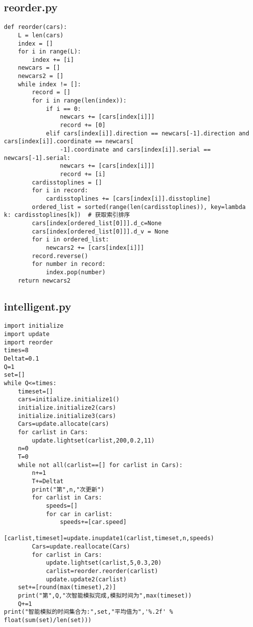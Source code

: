 \documentclass[a4paper,12pt]{article}
\numberwithin{equation}{section}
\begin{document}
\begin{appendix}
	\subsection{reorder.py}
	\begin{lstlisting}
def reorder(cars):    
    L = len(cars)
    index = []
    for i in range(L):
        index += [i]
    newcars = []
    newcars2 = []
    while index != []:
        record = []
        for i in range(len(index)):
            if i == 0:
                newcars += [cars[index[i]]]
                record += [0]
            elif cars[index[i]].direction == newcars[-1].direction and cars[index[i]].coordinate == newcars[
                -1].coordinate and cars[index[i]].serial == newcars[-1].serial:
                newcars += [cars[index[i]]]
                record += [i]
        cardisstoplines = []
        for i in record:
            cardisstoplines += [cars[index[i]].disstopline]
        ordered_list = sorted(range(len(cardisstoplines)), key=lambda k: cardisstoplines[k])  # 获取索引排序
        cars[index[ordered_list[0]]].d_c=None
        cars[index[ordered_list[0]]].d_v = None
        for i in ordered_list:
            newcars2 += [cars[index[i]]]
        record.reverse()
        for number in record:
            index.pop(number)
    return newcars2
	\end{lstlisting}
	\subsection{intelligent.py}
	\begin{lstlisting}
import initialize
import update
import reorder
times=8
Deltat=0.1
Q=1
set=[]
while Q<=times:
    timeset=[]
    cars=initialize.initialize1()
    initialize.initialize2(cars)
    initialize.initialize3(cars)
    Cars=update.allocate(cars)
    for carlist in Cars:
        update.lightset(carlist,200,0.2,11)
    n=0
    T=0
    while not all(carlist==[] for carlist in Cars):
        n+=1
        T+=Deltat
        print("第",n,"次更新")
        for carlist in Cars:
            speeds=[]
            for car in carlist:
                speeds+=[car.speed]
            [carlist,timeset]=update.inupdate1(carlist,timeset,n,speeds)
        Cars=update.reallocate(Cars)
        for carlist in Cars:
            update.lightset(carlist,5,0.3,20)
            carlist=reorder.reorder(carlist)
            update.update2(carlist) 
    set+=[round(max(timeset),2)]
    print("第",Q,"次智能模拟完成,模拟时间为",max(timeset))
    Q+=1
print("智能模拟的时间集合为:",set,"平均值为",'%.2f' % float(sum(set)/len(set)))
	\end{lstlisting}

\end{appendix}
\end{document}
